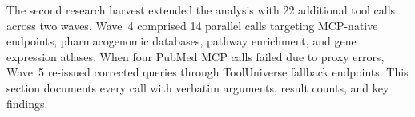 


The second research harvest extended the analysis with 22 additional tool calls
across two waves.  Wave~4 comprised 14 parallel calls targeting MCP-native
endpoints, pharmacogenomic databases, pathway enrichment, and gene expression
atlases.  When four PubMed MCP calls failed due to proxy errors, Wave~5
re-issued corrected queries through ToolUniverse fallback endpoints.  This
section documents every call with verbatim arguments, result counts, and key
findings.

